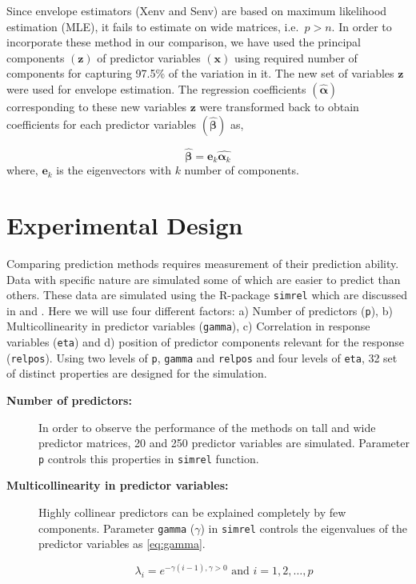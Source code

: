 \documentclass[12pt,3p,authoryear]{elsarticle}
\begin{document}
Since envelope estimators (Xenv and Senv) are based on maximum
likelihood estimation (MLE), it fails to estimate on wide matrices,
i.e.~\(p > n\). In order to incorporate these method in our comparison,
we have used the principal components \((\mathbf{z})\) of predictor
variables \((\mathbf{x})\) using required number of components for
capturing 97.5\% of the variation in it. The new set of variables
\(\mathbf{z}\) were used for envelope estimation. The regression
coefficients \((\hat{\boldsymbol{\alpha}})\) corresponding to these new
variables \(\mathbf{z}\) were transformed back to obtain coefficients
for each predictor variables \((\boldsymbol{\hat{\beta}})\) as,

\[\hat{\boldsymbol{\beta}} = \mathbf{e}_k\hat{\boldsymbol{\alpha}_k}\]
where, \(\mathbf{e}_k\) is the eigenvectors with \(k\) number of
components.

\hypertarget{experimental-design}{%
\section{Experimental Design}\label{experimental-design}}

Comparing prediction methods requires measurement of their prediction
ability. Data with specific nature are simulated some of which are
easier to predict than others. These data are simulated using the
R-package \texttt{simrel} which are discussed in \citet{saebo2015simrel}
and \citet{Rimal2018}. Here we will use four different factors: a)
Number of predictors (\texttt{p}), b) Multicollinearity in predictor
variables (\texttt{gamma}), c) Correlation in response variables
(\texttt{eta}) and d) position of predictor components relevant for the
response (\texttt{relpos}). Using two levels of \texttt{p},
\texttt{gamma} and \texttt{relpos} and four levels of \texttt{eta}, 32
set of distinct properties are designed for the simulation.

\begin{description}
\item[\textbf{Number of predictors:}]
In order to observe the performance of the methods on tall and wide
predictor matrices, 20 and 250 predictor variables are simulated.
Parameter \texttt{p} controls this properties in \texttt{simrel}
function.
\item[\textbf{Multicollinearity in predictor variables:}]
Highly collinear predictors can be explained completely by few
components. Parameter \texttt{gamma} (\(\gamma\)) in \texttt{simrel}
controls the eigenvalues of the predictor variables as \eqref{eq:gamma}.

\begin{equation}
  \lambda_i = e^{-\gamma(i - 1), \gamma > 0} \text{ and } i = 1, 2, \ldots, p
  \label{eq:gamma}
  \end{equation}
\end{description}
\end{document}
